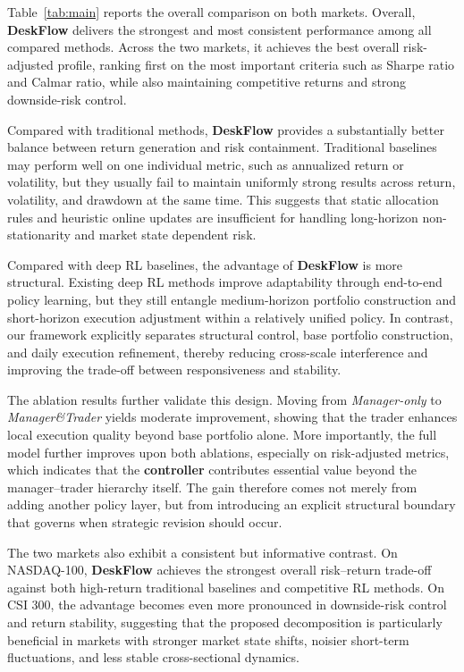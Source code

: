 \documentclass[letterpaper]{article} %
\begin{document}
Table~\ref{tab:main} reports the overall comparison on both markets. Overall, \textbf{\textbf{DeskFlow}} delivers the strongest and most consistent performance among all compared methods. Across the two markets, it achieves the best overall risk-adjusted profile, ranking first on the most important criteria such as Sharpe ratio and Calmar ratio, while also maintaining competitive returns and strong downside-risk control.

Compared with traditional methods, \textbf{DeskFlow} provides a substantially better balance between return generation and risk containment. Traditional baselines may perform well on one individual metric, such as annualized return or volatility, but they usually fail to maintain uniformly strong results across return, volatility, and drawdown at the same time. This suggests that static allocation rules and heuristic online updates are insufficient for handling long-horizon non-stationarity and market state dependent risk.

Compared with deep RL baselines, the advantage of \textbf{DeskFlow} is more structural. Existing deep RL methods improve adaptability through end-to-end policy learning, but they still entangle medium-horizon portfolio construction and short-horizon execution adjustment within a relatively unified policy. In contrast, our framework explicitly separates structural control, base portfolio construction, and daily execution refinement, thereby reducing cross-scale interference and improving the trade-off between responsiveness and stability.

The ablation results further validate this design. Moving from \textit{Manager-only} to \textit{Manager\&Trader} yields moderate improvement, showing that the trader enhances local execution quality beyond base portfolio alone. More importantly, the full model further improves upon both ablations, especially on risk-adjusted metrics, which indicates that the \textbf{controller} contributes essential value beyond the manager--trader hierarchy itself. The gain therefore comes not merely from adding another policy layer, but from introducing an explicit structural boundary that governs when strategic revision should occur.

The two markets also exhibit a consistent but informative contrast. On NASDAQ-100, \textbf{DeskFlow} achieves the strongest overall risk--return trade-off against both high-return traditional baselines and competitive RL methods. On CSI 300, the advantage becomes even more pronounced in downside-risk control and return stability, suggesting that the proposed decomposition is particularly beneficial in markets with stronger market state shifts, noisier short-term fluctuations, and less stable cross-sectional dynamics.
\end{document}
